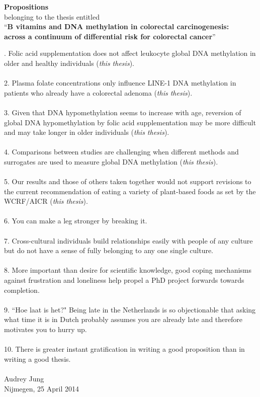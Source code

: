 \documentclass[10pt, A5paper]{article}
\begin{document}
{\centering \textbf{Propositions}\\
\smallskip
belonging to the thesis entitled\\
\smallskip
``\textbf{B vitamins and DNA methylation in colorectal carcinogenesis:\\across a continuum of differential risk for colorectal cancer}''\\
}

\bigskip
\smallskip

.	Folic acid supplementation does not affect leukocyte global DNA methylation in older and healthy individuals (\emph{this thesis}).\\
\quad\\
2.	Plasma folate concentrations only influence LINE-1 DNA methylation in patients who already have a colorectal adenoma (\emph{this thesis}).\\
\quad\\
3.	Given that DNA hypomethylation seems to increase with age, reversion of global DNA hypomethylation by folic acid supplementation may be more difficult and may take longer in older individuals (\emph{this thesis}).\\
\quad\\
4.	Comparisons between studies are challenging when different methods and surrogates are used to measure global DNA methylation (\emph{this thesis}).\\
\quad\\
5.	Our results and those of others taken together would not support revisions to the current recommendation of eating a variety of plant-based foods as set by the WCRF/AICR (\emph{this thesis}).\\
\quad\\
6.	You can make a leg stronger by breaking it.\\
\quad\\
7.	Cross-cultural individuals build relationships easily with people of any culture but do not have a sense of fully belonging to any one single culture.\\
\quad\\
8.	More important than desire for scientific knowledge, good coping mechanisms against frustration and loneliness help propel a PhD project forwards towards completion.\\
\quad\\
9. ``Hoe laat is het?" Being late in the Netherlands is so objectionable that asking what time it is in Dutch probably assumes you are already late and therefore motivates you to hurry up.\\
\quad\\
10.	There is greater instant gratification in writing a good proposition than in writing a good thesis.\\
\quad\\
\noindent
Audrey Jung\\
Nijmegen, 25 April 2014
\end{document}
